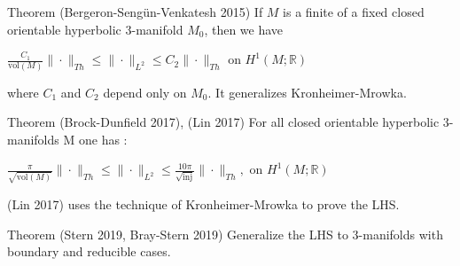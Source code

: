 \documentclass[t]{beamer}
\newcommand{\R}{\mathbb{R}}
\newcommand{\ds}{\displaystyle}
\newcommand{\vol}{\text{vol}}
\begin{document}
\begin{frame}[t]
	\begin{block}{Theorem (Bergeron-Seng\"{u}n-Venkatesh 2015)}
		If $M$ is a finite of a fixed closed orientable hyperbolic $3$-manifold $M_0$, then we have \\
		\begin{center}
			$\frac{C_1}{\vol(M)} \|\cdot\|_{Th} \leq \|\cdot \|_{L^2}\leq C_2\|\cdot\|_{Th} \text{ on } H^1(M;\R)$
		\end{center}
		where $C_1$ and $C_2$ depend only on $M_0$. It generalizes Kronheimer-Mrowka. 
	\end{block}
	\begin{block}{Theorem (Brock-Dunfield 2017), (Lin 2017)}
		For all closed orientable hyperbolic 3-manifolds M one has : 
		\begin{center}
			$\ds \frac{\pi}{\sqrt{\text{vol}(M)}} \| \cdot \|_{Th} \leq \| \cdot \|_{L^2} \leq \frac{10\pi}{\sqrt{\text{inj}}} \| \cdot \|_{Th}, \text{ on } H^1(M; \R) $
		\end{center} 
		(Lin 2017) uses the technique of Kronheimer-Mrowka to prove the LHS.
	\end{block}
	\begin{block}{Theorem (Stern 2019, Bray-Stern 2019)}
		Generalize the LHS to $3$-manifolds with boundary and reducible cases. 
	\end{block}
\end{frame}

\end{document}
